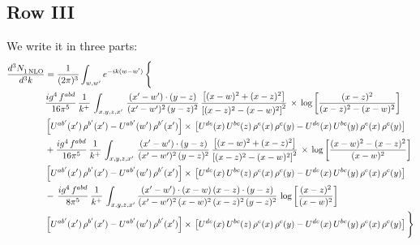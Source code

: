 \documentclass[9pt]{article}
\numberwithin{equation}{section}
\begin{document}
\subsection{Row III}
We write it in three parts:
\begin{align}
   \frac{d^{3}N_{1\,\rm NLO}^{\rm}}{d^{3}k}  & =  \frac{1}{(2\pi)^{3}}  \int_{w, w^\prime} e^{-ik(w-w^\prime)}\, \Bigg\{\notag \\
& \frac{ig^{4}\,f^{abd}}{16\pi^{5}}\, \frac{1}{k^{+}}\,\int_{x,y,z,x'}\, \frac{(x'-w')\cdot (y-z)}{(x'-w')^{2}\,(y-z)^{2}}\, \frac{\left[(x-w)^{2}+(x-z)^{2}\right]}{\left[(x-z)^{2}-(x-w)^{2}\right]^{2}}\, \times\, \log{\left[\frac{(x-z)^{2}}{(x-z)^{2}-(x-w)^{2}}\right]}\notag \\ & \left[U^{ab'}(x')\,\rho^{b'}(x')-U^{ab'}(w')\, \rho^{b'}(x')\right]\times\, \left[U^{de}(x)\,U^{bc}(z)\, \rho^{e}(x)\,\rho^{c}(y)-U^{de}(x)\,U^{bc}(y)\,\rho^{e}(x)\,\rho^{c}(y)\right] \notag \\
&  +\frac{ig^{4}\,f^{abd}}{16\pi^{5}}\, \frac{1}{k^{+}}\,\int_{x,y,z,x'}\, \frac{(x'-w')\cdot (y-z)}{(x'-w')^{2}\,(y-z)^{2}}\, \frac{\left[(x-w)^{2}+(x-z)^{2}\right]}{\left[(x-z)^{2}-(x-w)^{2}\right]^{2}}\, \times\, \log{\left[\frac{(x-w)^{2}-(x-z)^{2}}{(x-w)^{2}}\right]}\notag \\ & \left[U^{ab'}(x')\,\rho^{b'}(x')-U^{ab'}(w')\, \rho^{b'}(x')\right]\times\, \left[U^{de}(x)\,U^{bc}(z)\, \rho^{e}(x)\,\rho^{c}(y)-U^{de}(x)\,U^{bc}(y)\,\rho^{e}(x)\,\rho^{c}(y)\right] \notag \\
&-\, \frac{ig^{4}\,f^{abd}}{8\pi^{5}}\,\frac{1}{k^{+}}\,\int_{x,y,z,x'}\frac{(x'-w')\cdot (x-w)\, (x-z)\cdot (y-z)}{(x'-w')^{2}\, (x-w)^{2}\, (x-z)^{2}\, (y-z)^{2}}\,\log{\left[\frac{(x-z)^{2}}{(x-w)^{2}}\right]} \notag \\ & \left[U^{ab'}(x')\,\rho^{b'}(x')-U^{ab'}(w')\, \rho^{b'}(x')\right]\times\, \left[U^{de}(x)\,U^{bc}(z)\, \rho^{e}(x)\,\rho^{c}(y)-U^{de}(x)\,U^{bc}(y)\,\rho^{e}(x)\,\rho^{c}(y)\right]\Bigg\}
\end{align}
\end{document}

